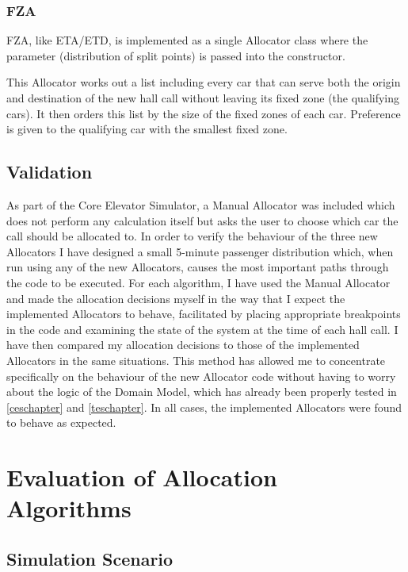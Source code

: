 \documentclass{UoYCSproject}
\begin{document}
\subsection{FZA}

FZA, like ETA/ETD, is implemented as a single Allocator class where the parameter (distribution of split points) is passed into the constructor.

This Allocator works out a list including every car that can serve both the origin and destination of the new hall call without leaving its fixed zone (the qualifying cars).  It then orders this list by the size of the fixed zones of each car.  Preference is given to the qualifying car with the smallest fixed zone.

\section{Validation}

As part of the Core Elevator Simulator, a Manual Allocator was included which does not perform any calculation itself but asks the user to choose which car the call should be allocated to.  In order to verify the behaviour of the three new Allocators I have designed a small 5-minute passenger distribution which, when run using any of the new Allocators, causes the most important paths through the code to be executed.  For each algorithm, I have used the Manual Allocator and made the allocation decisions myself in the way that I expect the implemented Allocators to behave, facilitated by placing appropriate breakpoints in the code and examining the state of the system at the time of each hall call.  I have then compared my allocation decisions to those of the implemented Allocators in the same situations.  This method has allowed me to concentrate specifically on the behaviour of the new Allocator code without having to worry about the logic of the Domain Model, which has already been properly tested in \autoref{ceschapter} and \autoref{teschapter}.  In all cases, the implemented Allocators were found to behave as expected.

\chapter{Evaluation of Allocation Algorithms}
\label{algevaluation}

\section{Simulation Scenario}
\end{document}
